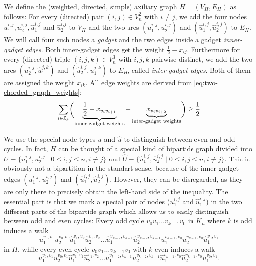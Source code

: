 We define the (weighted, directed, simple) axiliary graph $H = (V_{H}, E_{H})$ as follows:
For every (directed) pair $(i,j) \in V_{n}^{2}$ with $i \neq j$, we add the four nodes $u_{1}^{i,j}, u_{2}^{i,j}, \hat{u}_{1}^{i,j}$ and $\hat{u}_{2}^{i,j}$ to $V_{H}$ 
and the two arcs $(u_{1}^{i,j}, u_{2}^{i,j})$ and $(\hat{u}_{1}^{i,j}, \hat{u}_{2}^{i,j})$ to $E_{H}$.
We will call four such nodes a \textit{gadget} and the two edges inside a gadget \textit{inner-gadget edges}.
Both inner-gadget edges get the weight $\frac{1}{2} - x_{ij}$.
Furthermore for every (directed) triple $(i,j,k) \in V_{n}^{3}$ with $i,j,k$ pairwise distinct, we add the two arcs $(u_{2}^{i,j}, \hat{u}_{1}^{j,k})$ and $(\hat{u}_{2}^{i,j}, u_{1}^{j,k})$ to $E_{H}$, called \textit{inter-gadget edges}.
Both of them are assigned the weight $x_{ik}$.
All edge weights are derived from \cref{eq:two-chorded_graph_weights}:
\begin{equation*}
	\sum_{i \in \mathbb{Z}_k} \biggl( \underbrace{ \frac{1}{2} -x_{v_i v_{i+1}} }_{\text{inner-gadget weights}} + \underbrace{x_{v_i v_{i+2}}}_{\text{inter-gadget weights}} \biggr) \geq \frac{1}{2}
\end{equation*}

We use the special node types $u$ and $\hat{u}$ to distinguish between even and odd cycles.
In fact, $H$ can be thought of a special kind of bipartide graph divided into ${U = \big\{ u_{1}^{i,j}, u_{2}^{i,j} \mid 0 \leq i,j \leq n, i \neq j \big\}}$ and $\hat{U} = \big\{ \hat{u}_{1}^{i,j}, \hat{u}_{2}^{i,j} \mid 0 \leq i,j \leq n, i \neq j \big\}$.
This is obviously not a bipartition in the standart sense, because of the inner-gadget edges $(u_{1}^{i,j}, u_{2}^{i,j})$ and $(\hat{u}_{1}^{i,j}, \hat{u}_{2}^{i,j})$.
However, they can be disregarded, as they are only there to precisely obtain the left-hand side of the inequality.
The essential part is that we mark a special pair of nodes ($u_{1}^{i,j}$ and $\hat{u}_{1}^{i,j}$) in the two different parts of the bipartide graph which allows us to easily distinguish between odd and even cycles:
Every odd cycle $v_{0}v_{1} \ldots v_{k-1}v_{0}$ in $K_{n}$ where $k$ is odd induces a walk
\[
	u_{1}^{v_{0}, v_{1}}u_{2}^{v_{0}, v_{1}}\hat{u}_{1}^{v_{1}, v_{2}}\hat{u}_{2}^{v_{1}, v_{2}}
	\ldots
	\hat{u}_{1}^{v_{k-2}, v_{k-1}}\hat{u}_{2}^{v_{k-2}, v_{k-1}}u_{1}^{v_{k-1}, v_{0}}u_{2}^{v_{k-1}, v_{0}}\hat{u}_{1}^{v_{0}, v_{1}}
\]
in $H$, while every even cycle $v_{0}v_{1} \ldots v_{k-1}v_{0}$ with $k$ even induces a walk
\[
	u_{1}^{v_{0}, v_{1}}u_{2}^{v_{0}, v_{1}}\hat{u}_{1}^{v_{1}, v_{2}}\hat{u}_{2}^{v_{1}, v_{2}}
	\ldots
	u_{1}^{v_{k-2}, v_{k-1}}u_{2}^{v_{k-2}, v_{k-1}}\hat{u}_{1}^{v_{k-1}, v_{0}}\hat{u}_{2}^{v_{k-1}, v_{0}}u_{1}^{v_{0}, v_{1}}
.\]

